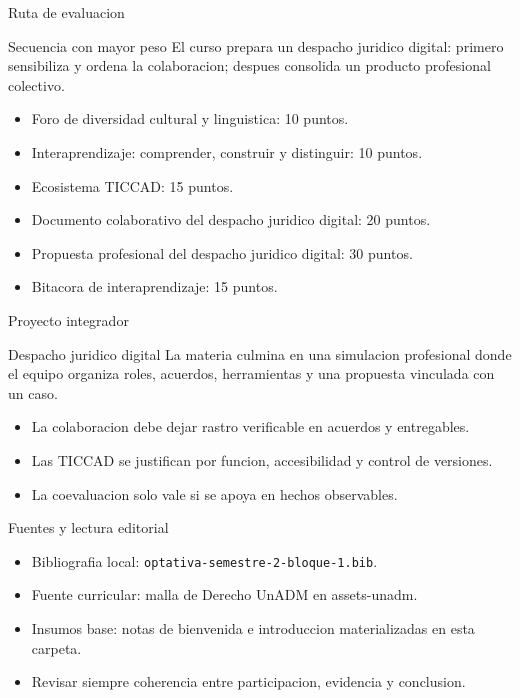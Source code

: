 \documentclass[
  spanish,
  aspectratio=169,
  xcolor={dvipsnames,table}
]{beamer}
\begin{document}
\begin{frame}{Ruta de evaluacion}
  \begin{block}{Secuencia con mayor peso}
    El curso prepara un despacho juridico digital: primero sensibiliza y ordena
    la colaboracion; despues consolida un producto profesional colectivo.
  \end{block}
  \begin{itemize}
    \item Foro de diversidad cultural y linguistica: 10 puntos.
    \item Interaprendizaje: comprender, construir y distinguir: 10 puntos.
    \item Ecosistema TICCAD: 15 puntos.
    \item Documento colaborativo del despacho juridico digital: 20 puntos.
    \item Propuesta profesional del despacho juridico digital: 30 puntos.
    \item Bitacora de interaprendizaje: 15 puntos.
  \end{itemize}
\end{frame}

\begin{frame}{Proyecto integrador}
  \begin{block}{Despacho juridico digital}
    La materia culmina en una simulacion profesional donde el equipo organiza
    roles, acuerdos, herramientas y una propuesta vinculada con un caso.
  \end{block}
  \begin{itemize}
    \item La colaboracion debe dejar rastro verificable en acuerdos y entregables.
    \item Las TICCAD se justifican por funcion, accesibilidad y control de versiones.
    \item La coevaluacion solo vale si se apoya en hechos observables.
  \end{itemize}
\end{frame}

\begin{frame}{Fuentes y lectura editorial}
  \begin{itemize}
    \item Bibliografia local: \texttt{optativa-semestre-2-bloque-1.bib}.
    \item Fuente curricular: malla de Derecho UnADM en assets-unadm.
    \item Insumos base: notas de bienvenida e introduccion materializadas en esta carpeta.
    \item Revisar siempre coherencia entre participacion, evidencia y conclusion.
  \end{itemize}
\end{frame}
\end{document}
